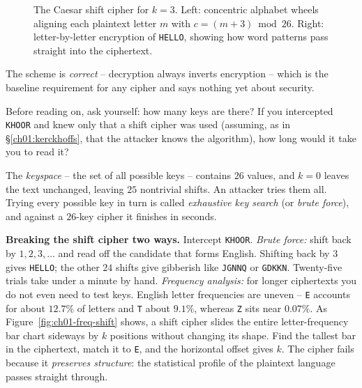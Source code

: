\begin{figure}[htbp]
\caption{The Caesar shift cipher for $k=3$. Left: concentric alphabet wheels aligning each plaintext letter $m$ with $c = (m+3) \bmod 26$. Right: letter-by-letter encryption of \texttt{HELLO}, showing how word patterns pass straight into the ciphertext.}
\label{ch01:fig-caesar-wheel}
\end{figure}

The scheme is \emph{correct} -- decryption always inverts encryption -- which is the baseline requirement for any cipher and says nothing yet about security.

\begin{walkbox}
Before reading on, ask yourself: how many keys are there? If you intercepted \texttt{KHOOR} and knew only that a shift cipher was used (assuming, as in \S\ref{ch01:kerckhoffs}, that the attacker knows the algorithm), how long would it take you to read it?
\end{walkbox}

The \emph{keyspace} -- the set of all possible keys -- contains $26$ values, and $k=0$ leaves the text unchanged, leaving $25$ nontrivial shifts. An attacker tries them all. Trying every possible key in turn is called \emph{exhaustive key search} (or \emph{brute force}), and against a $26$-key cipher it finishes in seconds.

\begin{attackbox}
\textbf{Breaking the shift cipher two ways.} Intercept \texttt{KHOOR}.
\emph{Brute force:} shift back by $1,2,3,\dots$ and read off the candidate that forms English. Shifting back by $3$ gives \texttt{HELLO}; the other $24$ shifts give gibberish like \texttt{JGNNQ} or \texttt{GDKKN}. Twenty-five trials take under a minute by hand.
\emph{Frequency analysis:} for longer ciphertexts you do not even need to test keys. English letter frequencies are uneven -- \texttt{E} accounts for about $12.7\%$ of letters and \texttt{T} about $9.1\%$, whereas \texttt{Z} sits near $0.07\%$. As Figure~\ref{fig:ch01-freq-shift} shows, a shift cipher slides the entire letter-frequency bar chart sideways by $k$ positions without changing its shape. Find the tallest bar in the ciphertext, match it to \texttt{E}, and the horizontal offset gives $k$. The cipher fails because it \emph{preserves structure}: the statistical profile of the plaintext language passes straight through.
\end{attackbox}

